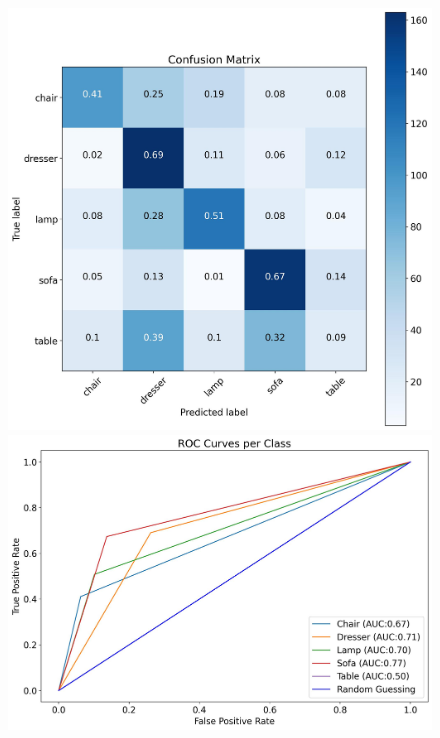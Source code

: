 \documentclass[11pt,a4paper]{article}
\begin{document}
\begin{figure}[H]
{{    \includegraphics[scale=0.13]{imgs/experiments/images/4/Experiment-4-TESTING-confusion-matrix.jpg}
    \includegraphics[scale=0.13]{imgs/experiments/images/4/Experiment-4-TESTING-ROC.jpg}
    }}
    \qquad
\end{figure}
\end{document}
